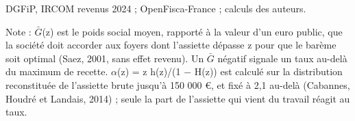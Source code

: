 DGFiP, IRCOM revenus 2024 ; OpenFisca-France ; calculs des auteurs.\par Note : $\bar G$(z) est le poids social moyen, rapporté à la valeur d'un euro public, que la société doit accorder aux foyers dont l'assiette dépasse z pour que le barème soit optimal (Saez, 2001, sans effet revenu). Un $\bar G$ négatif signale un taux au-delà du maximum de recette. $\alpha$(z) = z h(z)/(1 $-$ H(z)) est calculé sur la distribution reconstituée de l'assiette brute jusqu'à 150 000 \euro{}, et fixé à 2,1 au-delà (Cabannes, Houdré et Landais, 2014) ; seule la part de l'assiette qui vient du travail réagit au taux.
